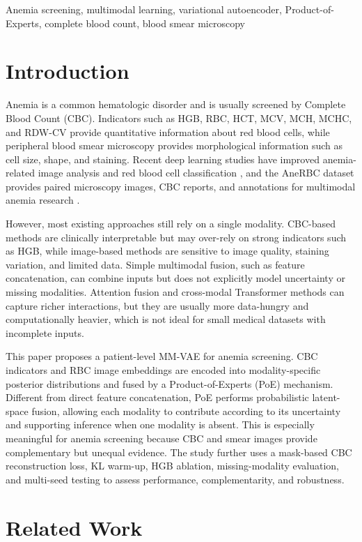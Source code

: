 \documentclass[conference]{IEEEtran}
\begin{document}
\begin{IEEEkeywords}
Anemia screening, multimodal learning, variational autoencoder, Product-of-Experts, complete blood count, blood smear microscopy
\end{IEEEkeywords}

\section{Introduction}

Anemia is a common hematologic disorder and is usually screened by Complete Blood Count (CBC). Indicators such as HGB, RBC, HCT, MCV, MCH, MCHC, and RDW-CV provide quantitative information about red blood cells, while peripheral blood smear microscopy provides morphological information such as cell size, shape, and staining. Recent deep learning studies have improved anemia-related image analysis and red blood cell classification \cite{ref1,ref2}, and the AneRBC dataset provides paired microscopy images, CBC reports, and annotations for multimodal anemia research \cite{ref3}.

However, most existing approaches still rely on a single modality. CBC-based methods are clinically interpretable but may over-rely on strong indicators such as HGB, while image-based methods are sensitive to image quality, staining variation, and limited data. Simple multimodal fusion, such as feature concatenation, can combine inputs but does not explicitly model uncertainty or missing modalities. Attention fusion and cross-modal Transformer methods can capture richer interactions, but they are usually more data-hungry and computationally heavier, which is not ideal for small medical datasets with incomplete inputs.

This paper proposes a patient-level MM-VAE for anemia screening. CBC indicators and RBC image embeddings are encoded into modality-specific posterior distributions and fused by a Product-of-Experts (PoE) mechanism. Different from direct feature concatenation, PoE performs probabilistic latent-space fusion, allowing each modality to contribute according to its uncertainty and supporting inference when one modality is absent. This is especially meaningful for anemia screening because CBC and smear images provide complementary but unequal evidence. The study further uses a mask-based CBC reconstruction loss, KL warm-up, HGB ablation, missing-modality evaluation, and multi-seed testing to assess performance, complementarity, and robustness.

\section{Related Work}
\end{document}
